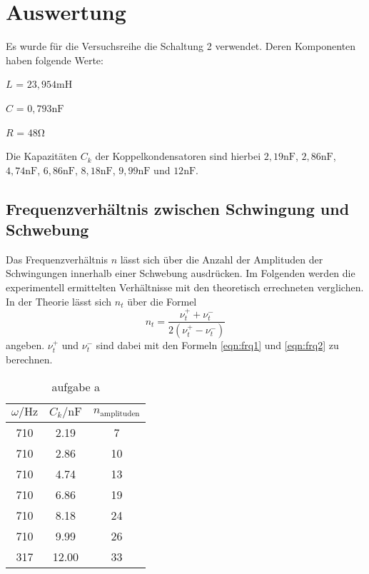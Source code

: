\section{Auswertung}
\label{sec:Auswertung}

Es wurde für die Versuchsreihe die Schaltung 2 verwendet. Deren Komponenten haben folgende Werte:

$L$ = $23,954 \si{\milli\henry}$

$C$ = $0,793 \si{\nano\farad}$

$R$ = $48 \si{\ohm}$

Die Kapazitäten $C_k$ der Koppelkondensatoren sind hierbei $2,19 \si{\nano\farad}$, $2,86 \si{\nano\farad}$,
$4,74 \si{\nano\farad}$, $6,86 \si{\nano\farad}$, $8,18 \si{\nano\farad}$, $9,99 \si{\nano\farad}$ und
$12 \si{\nano\farad}$.

\subsection{Frequenzverhältnis zwischen Schwingung und Schwebung}

Das Frequenzverhältnis $n$ lässt sich über die Anzahl der Amplituden der Schwingungen innerhalb einer Schwebung 
ausdrücken. Im Folgenden werden die experimentell ermittelten Verhältnisse mit den theoretisch errechneten verglichen.
In der Theorie lässt sich $n_t$ über die Formel \begin{equation}
    n_t = \frac{\nu_{t}^{+} + \nu_{t}^{-}}{2(\nu_{t}^{+} - \nu_{t}^{-})}
\end{equation}
angeben. $\nu_{t}^{+}$ und $\nu_{t}^{-}$ sind dabei mit den Formeln \ref{eqn:frq1} und \ref{eqn:frq2} zu berechnen.


\begin{table}
    \centering
    \caption{aufgabe a}
    \label{tab:a}
    \begin{tabular}{c c c}
        \toprule
        {$\omega / \si{\hertz}$} & {$C_k / \si{\nano\farad}$} & {$n_\text{amplituden}$} \\
        \midrule
        710 &  2.19 &  7 \\  
        710 &  2.86 & 10 \\
        710 &  4.74 & 13 \\
        710 &  6.86 & 19 \\
        710 &  8.18 & 24 \\
        710 &  9.99 & 26 \\
        317 & 12.00 & 33 \\
        \bottomrule
    \end{tabular}
\end{table}

